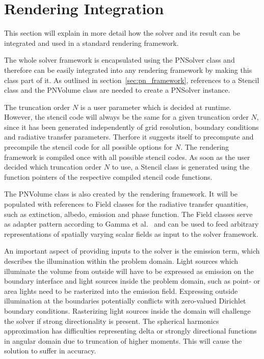 \section{Rendering Integration}
\label{sec:pn_rendering_integration}

This section will explain in more detail how the solver and its result can be integrated and used in a standard rendering framework.

The whole solver framework is encapsulated using the PNSolver class and therefore can be easily integrated into any rendering framework by making this class part of it. As outlined in section~\ref{sec:pn_framework}, references to a Stencil class and the PNVolume class are needed to create a PNSolver instance.

The truncation order $N$ is a user parameter which is decided at runtime. However, the stencil code will always be the same for a given truncation order $N$, since it has been generated independently of grid resolution, boundary conditions and radiative transfer parameters. Therfore it suggests itself to precompute and precompile the stencil code for all possible options for $N$. The rendering framework is compiled once with all possible stencil codes. As soon as the user decided which truncation order $N$ to use, a Stencil class is generated using the function pointers of the respective compiled stencil code functions.

The PNVolume class is also created by the rendering framework. It will be populated with references to Field classes for the radiative transfer quantities, such as extinction, albedo, emission and phase function. The Field classes serve as adapter pattern according to Gamma et al.~\cite{Gamma95} and can be used to feed arbitrary representations of spatially varying scalar fields as input to the solver framework.

An important aspect of providing inputs to the solver is the emission term, which describes the illumination within the problem domain. Light sources which illuminate the volume from outside will have to be expressed as emission on the boundary interface and light sources inside the problem domain, such as point- or area lights need to be rasterized into the emission field. Expressing outside illumination at the boundaries potentially conflicts with zero-valued Dirichlet boundary conditions. Rasterizing light sources inside the domain will challenge the solver if strong directionality is present. The spherical harmonics approximation has difficulties representing delta or strongly directional functions in angular domain due to truncation of higher moments. This will cause the solution to suffer in accuracy.

